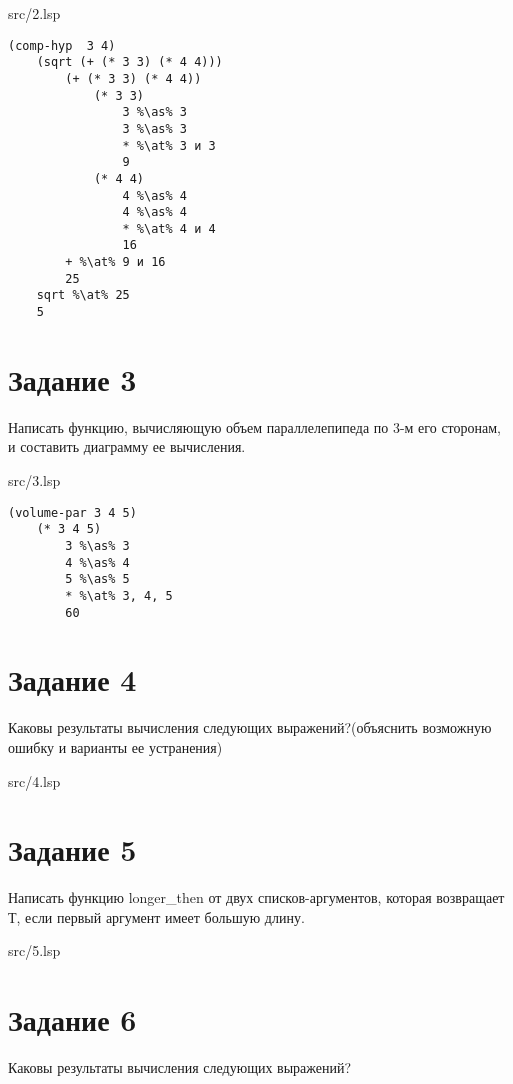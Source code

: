 \FloatBarrier
\begin{lstinputlisting}[style={lsp}]{src/2.lsp}
\end{lstinputlisting}
\FloatBarrier

\begin{lstlisting}[style={scheme}]
(comp-hyp  3 4)
	(sqrt (+ (* 3 3) (* 4 4)))
		(+ (* 3 3) (* 4 4))
			(* 3 3)
				3 %\as% 3
				3 %\as% 3
				* %\at% 3 и 3
				9
			(* 4 4)
				4 %\as% 4
				4 %\as% 4
				* %\at% 4 и 4
				16
		+ %\at% 9 и 16
		25
	sqrt %\at% 25
	5
\end{lstlisting}
\clearpage
\section*{Задание 3}
Написать функцию, вычисляющую объем параллелепипеда по 3-м его сторонам, и
составить диаграмму ее вычисления.

\FloatBarrier
\begin{lstinputlisting}[style={lsp}]{src/3.lsp}
\end{lstinputlisting}
\FloatBarrier

\begin{lstlisting}[style={scheme}]
(volume-par 3 4 5)
	(* 3 4 5)
		3 %\as% 3
		4 %\as% 4
		5 %\as% 5
		* %\at% 3, 4, 5
		60
\end{lstlisting}

\section*{Задание 4}
Каковы результаты вычисления следующих выражений?(объяснить возможную ошибку и
варианты ее устранения)

\FloatBarrier
\begin{lstinputlisting}[style={lsp}]{src/4.lsp}
\end{lstinputlisting}
\FloatBarrier

\section*{Задание 5}
Написать функцию longer\_then от двух списков-аргументов, которая возвращает Т, если
первый аргумент имеет большую длину.

\FloatBarrier
\begin{lstinputlisting}[style={lsp}]{src/5.lsp}
\end{lstinputlisting}
\FloatBarrier

\section*{Задание 6}
Каковы результаты вычисления следующих выражений?

